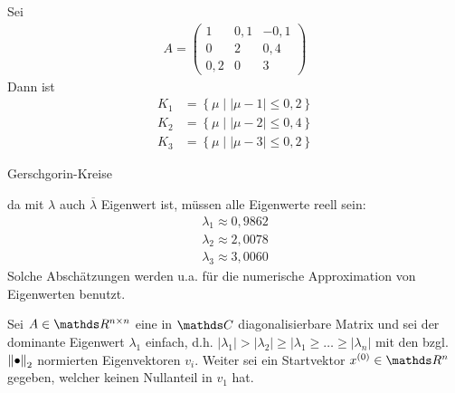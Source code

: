   \begin{Bspe}
    Sei 
    \begin{gather*}
      A=
      \begin{pmatrix}
        1 & 0,1 & -0,1\\
        0 & 2 & 0,4 \\
        0,2 & 0 & 3
      \end{pmatrix}
    \end{gather*}
    Dann ist
    \begin{align*}
      K_1 &= \left\{ \mu \mid |\mu-1|\leq 0,2 \right\} \\
      K_2 &= \left\{ \mu \mid |\mu-2|\leq 0,4 \right\} \\
      K_3 &= \left\{ \mu \mid |\mu-3|\leq 0,2 \right\}
    \end{align*}
    \begin{image}{Gerschgorin-Kreise}
\end{image}\label{im8.1.3}
da mit $\lambda$ auch $\overline{\lambda}$ Eigenwert ist,
müssen alle Eigenwerte reell sein:
\begin{align*}
  \lambda_1 \approx 0,9862 \\
  \lambda_2 \approx 2,0078 \\
  \lambda_3 \approx 3,0060
\end{align*}
Solche Abschätzungen werden u.a. für die numerische
Approximation von Eigenwerten benutzt.
\end{Bspe}


\label{8.2.1}
Sei $A\in\R^{n\times n}$ eine  in $\C$
diagonalisierbare Matrix und 
sei der dominante Eigenwert $\lambda_1$ einfach,
d.h. 
$|\lambda_1|>|\lambda_2|\geq |\lambda_1\geq \ldots\geq |\lambda_n|$
mit den bzgl. $\left\| \bullet \right\|_2$ normierten Eigenvektoren $v_i$.
Weiter sei ein Startvektor $x^{(0)}\in\R^n$ gegeben,
welcher 
keinen Nullanteil in $v_1$ hat.

